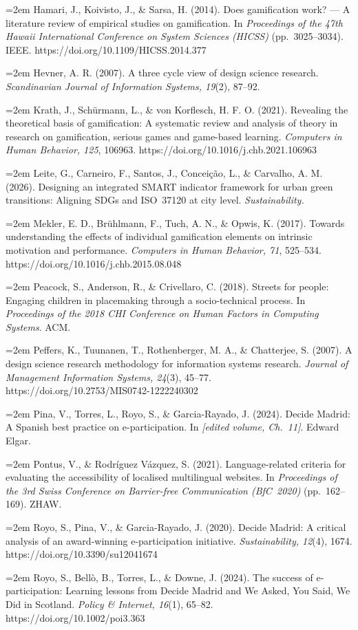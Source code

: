 \documentclass[11pt,a4paper]{article}
\newcommand{\refitem}[1]{\noindent\hangindent=2em\hangafter=1 #1\par\smallskip}
\begin{document}
\refitem{Hamari, J., Koivisto, J., \& Sarsa, H. (2014). Does gamification work? --- A literature review of empirical studies on gamification. In \emph{Proceedings of the 47th Hawaii International Conference on System Sciences (HICSS)} (pp.~3025--3034). IEEE. https://doi.org/10.1109/HICSS.2014.377}
\refitem{Hevner, A. R. (2007). A three cycle view of design science research. \emph{Scandinavian Journal of Information Systems, 19}(2), 87--92.}
\refitem{Krath, J., Sch\"urmann, L., \& von Korflesch, H. F. O. (2021). Revealing the theoretical basis of gamification: A systematic review and analysis of theory in research on gamification, serious games and game-based learning. \emph{Computers in Human Behavior, 125}, 106963. https://doi.org/10.1016/j.chb.2021.106963}
\refitem{Leite, G., Carneiro, F., Santos, J., Concei\c{c}\~ao, L., \& Carvalho, A. M. (2026). Designing an integrated SMART indicator framework for urban green transitions: Aligning SDGs and ISO~37120 at city level. \emph{Sustainability.}}
\refitem{Mekler, E. D., Br\"uhlmann, F., Tuch, A. N., \& Opwis, K. (2017). Towards understanding the effects of individual gamification elements on intrinsic motivation and performance. \emph{Computers in Human Behavior, 71}, 525--534. https://doi.org/10.1016/j.chb.2015.08.048}
\refitem{Peacock, S., Anderson, R., \& Crivellaro, C. (2018). Streets for people: Engaging children in placemaking through a socio-technical process. In \emph{Proceedings of the 2018 CHI Conference on Human Factors in Computing Systems}. ACM.}
\refitem{Peffers, K., Tuunanen, T., Rothenberger, M. A., \& Chatterjee, S. (2007). A design science research methodology for information systems research. \emph{Journal of Management Information Systems, 24}(3), 45--77. https://doi.org/10.2753/MIS0742-1222240302}
\refitem{Pina, V., Torres, L., Royo, S., \& Garcia-Rayado, J. (2024). Decide Madrid: A Spanish best practice on e-participation. In \emph{[edited volume, Ch.~11]}. Edward Elgar.}
\refitem{Pontus, V., \& Rodr\'iguez V\'azquez, S. (2021). Language-related criteria for evaluating the accessibility of localised multilingual websites. In \emph{Proceedings of the 3rd Swiss Conference on Barrier-free Communication (BfC~2020)} (pp.~162--169). ZHAW.}
\refitem{Royo, S., Pina, V., \& Garcia-Rayado, J. (2020). Decide Madrid: A critical analysis of an award-winning e-participation initiative. \emph{Sustainability, 12}(4), 1674. https://doi.org/10.3390/su12041674}
\refitem{Royo, S., Bell\`o, B., Torres, L., \& Downe, J. (2024). The success of e-participation: Learning lessons from Decide Madrid and We Asked, You Said, We Did in Scotland. \emph{Policy \& Internet, 16}(1), 65--82. https://doi.org/10.1002/poi3.363}
\end{document}
